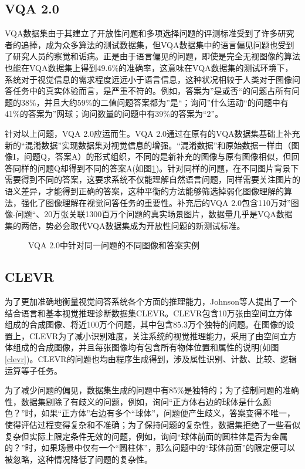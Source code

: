 \subsection{VQA 2.0}
VQA数据集由于其建立了开放性问题和多项选择问题的评测标准受到了许多研究者的追捧，成为众多算法的测试数据集，但VQA数据集中的语言偏见问题也受到了研究人员的察觉和诟病。正是由于语言偏见的问题，即使是完全无视图像的算法也能在VQA数据集上得到49.6\%的准确率，这意味在VQA数据集的测试环境下，系统对于视觉信息的需求程度远远小于语言信息，这种状况相较于人类对于图像问答任务中的真实体验而言，是严重不符的。例如，答案为”是或否“的问题占所有问题的38\%，并且大约59\%的二值问题答案都为”是“；询问”什么运动“的问题中有41\%的答案为”网球；询问数量的问题中有39\%的答案为“2”。

针对以上问题，VQA 2.0应运而生。VQA 2.0通过在原有的VQA数据集基础上补充新的“混淆数据”实现数据集对视觉信息的增强。“混淆数据”和原始数据一样由（图像I，问题Q，答案A）的形式组织，不同的是新补充的图像与原有图像相似，但回答同样的问题Q却得到不同的答案A(如图\ref{vqa2})。针对同样的问题，在不同图片背景下需要得到不同的答案，这要求系统不仅能理解自然语言问题，同样需要关注图片的语义差异，才能得到正确的答案，这种平衡的方法能够筛选掉弱化图像理解的算法，强化了图像理解在视觉问答任务的重要性。补充后的VQA 2.0包含110万对”图像-问题“、20万张关联1300百万个问题的真实场景图片，数据量几乎是VQA数据集的两倍，势必会取代VQA数据集成为开放性问题的新测试标准。
\begin{figure}[H]
	\centering
	\caption{VQA 2.0中针对同一问题的不同图像和答案实例}
	\label{vqa2}
\end{figure}

\subsection{CLEVR}
为了更加准确地衡量视觉问答系统各个方面的推理能力，Johnson等人提出了一个结合语言和基本视觉推理诊断数据集CLEVR。CLEVR包含10万张由空间立方体组成的合成图像、将近100万个问题，其中包含85.3万个独特的问题。在图像的设置上，CLEVR为了减小识别难度，关注系统的视觉推理能力，采用了由空间立方体组成的合成图像，并且每张图像均有包含所有物体位置和属性的说明(如图\ref{clevr})。CLEVR的问题也均由程序生成得到，涉及属性识别、计数、比较、逻辑运算等子任务。

为了减少问题的偏见，数据集生成的问题中有85\%是独特的；为了控制问题的准确性，数据集剔除了有歧义的问题，例如，询问“正方体右边的球体是什么颜色？”时，如果“正方体”右边有多个“球体”，问题便产生歧义，答案变得不唯一，使得评估过程变得复杂和不准确；为了保持问题的复杂性，数据集拒绝了一些看似复杂但实际上限定条件无效的问题，例如，询问“球体前面的圆柱体是否为金属的？”时，如果场景中仅有一个“圆柱体”，那么问题中的“球体前面”的限定便可以被忽略，这种情况降低了问题的复杂性。

